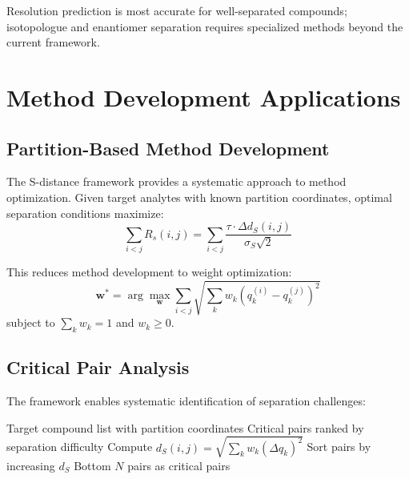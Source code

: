 \documentclass[twocolumn,10pt]{article}
\begin{document}
Resolution prediction is most accurate for well-separated compounds; isotopologue and enantiomer separation requires specialized methods beyond the current framework.

\section{Method Development Applications}
\label{sec:applications}

\subsection{Partition-Based Method Development}

The S-distance framework provides a systematic approach to method optimization. Given target analytes with known partition coordinates, optimal separation conditions maximize:
\begin{equation}
\sum_{i < j} R_s(i, j) = \sum_{i < j} \frac{\tau \cdot \Delta d_S(i,j)}{\sigma_S \sqrt{2}}
\end{equation}

This reduces method development to weight optimization:
\begin{equation}
\mathbf{w}^* = \arg\max_{\mathbf{w}} \sum_{i < j} \sqrt{\sum_k w_k (q_k^{(i)} - q_k^{(j)})^2}
\end{equation}
subject to $\sum_k w_k = 1$ and $w_k \geq 0$.

\subsection{Critical Pair Analysis}

The framework enables systematic identification of separation challenges:

\begin{algorithm}[H]
\caption{Critical Pair Identification}
\begin{algorithmic}[1]
\REQUIRE Target compound list with partition coordinates
\ENSURE Critical pairs ranked by separation difficulty
    \STATE Compute $d_S(i, j) = \sqrt{\sum_k w_k (\Delta q_k)^2}$
\ENDFOR
\STATE Sort pairs by increasing $d_S$
\RETURN Bottom $N$ pairs as critical pairs
\end{algorithmic}
\end{algorithm}
\end{document}
